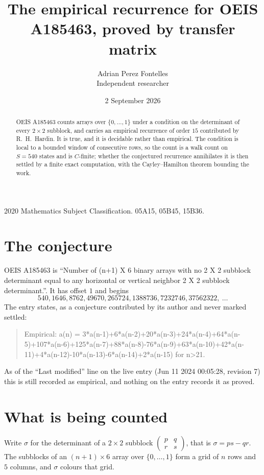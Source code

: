 \documentclass[11pt,a4paper]{article}
\title{The empirical recurrence for OEIS A185463, proved by transfer matrix}
\author{Adrian Perez Fontelles\\ \small Independent researcher}
\date{2 September 2026}
\theoremstyle{plain}
\theoremstyle{definition}
\begin{document}
\maketitle

\begin{abstract}
OEIS A185463 counts arrays over $\{0,\dots,1\}$ under a condition on the determinant of every
$2\times2$ subblock, and carries an empirical recurrence of order $15$ contributed by
R.~H.~Hardin. It is true, and it is decidable rather than empirical. The condition is local to
a bounded window of consecutive rows, so the count is a walk count on $S=540$ states and is
$C$-finite; whether the conjectured recurrence annihilates it is then settled by a finite exact
computation, with the Cayley--Hamilton theorem bounding the work.
\end{abstract}

\noindent\small 2020 Mathematics Subject Classification. 05A15, 05B45, 15B36.\normalsize

\section{The conjecture}

OEIS A185463 is ``Number of (n+1) X 6 binary arrays with no 2 X 2 subblock determinant equal to any horizontal or vertical neighbor 2 X 2 subblock determinant.''. It has offset $1$ and begins
\[
540, 1646, 8762, 49670, 265724, 1388736, 7232746, 37562322,\ \dots
\]
The entry states, as a conjecture contributed by its author and never marked settled:
\begin{quote}
Empirical: a(n) = 3*a(n-1)+6*a(n-2)+20*a(n-3)+24*a(n-4)+64*a(n-5)+107*a(n-6)+125*a(n-7)+88*a(n-8)-76*a(n-9)+63*a(n-10)+42*a(n-11)+4*a(n-12)-10*a(n-13)-6*a(n-14)+2*a(n-15) for n>21.
\end{quote}
As of the ``Last modified'' line on the live entry (Jun 11 2024 00:05:28, revision 7) this is still
recorded as empirical, and nothing on the entry records it as proved.

\section{What is being counted}

Write $\sigma$ for the determinant of a $2\times2$ subblock
$\begin{pmatrix}p&q\\r&s\end{pmatrix}$, that is $\sigma=ps-qr$. The subblocks of an
$(n+1)\times6$ array over $\{0,\dots,1\}$ form a grid of $n$ rows and $5$
columns, and $\sigma$ colours that grid.
\end{document}
